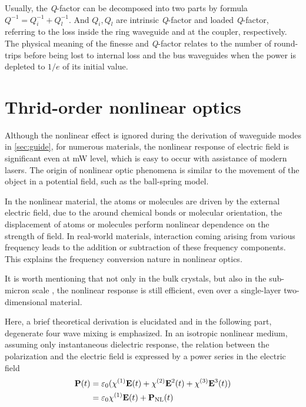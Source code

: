 Usually, the \textit{Q}-factor can be decomposed into two parts by formula $Q^{-1}=Q_{i}^{-1} + Q_{l}^{-1}$. And $Q_{i}, Q_{l}$ are intrinsic \textit{Q}-factor and loaded \textit{Q}-factor, referring to the loss inside the ring waveguide and at the coupler, respectively. The physical meaning of the finesse and \textit{Q}-factor relates to the number of round-trips before being lost to internal loss and the bus waveguides when the power is depleted to $1/e$ of its initial value.

\section{Thrid-order nonlinear optics}

Although the nonlinear effect is ignored during the derivation of waveguide modes in \autoref{sec:guide}, 
for numerous materials, the nonlinear response of electric field is significant even at mW level, which is easy to occur with assistance of modern lasers. The origin of nonlinear optic phenomena is similar to the movement of the object in a potential field, such as the ball-spring model. 

In the nonlinear material, the atoms or molecules are driven by the external electric field, due to the around chemical bonds or molecular orientation, the displacement of atoms or molecules perform nonlinear dependence on the strength of field. In real-world materials, interaction coming arising from various frequency leads to the addition or subtraction of these frequency components. This explains the frequency conversion nature in nonlinear optics.

It is worth mentioning that not only in the bulk crystals, but also in the sub-micron scale \cite{Leuthold2010}, the nonlinear response is still efficient, even over a single-layer two-dimensional material.

Here, a brief theoretical derivation is elucidated and in the following part, degenerate four wave mixing is emphasized. In an isotropic nonlinear medium, assuming only instantaneous dielectric response, the relation between the polarization and the electric field is expressed by a power series in the electric field
\begin{align}\label{eq:nlp}
    \vb{P}(t) & = \varepsilon_0 \large (\chi^{(1)}\vb{E}(t) + \chi^{(2)}\vb{E}^2(t) + \chi^{(3)}\vb{E}^3(t)) \\
			& = \varepsilon_0 \chi^{(1)}\vb{E}(t) + \vb{P}_\mathrm{NL}(t)
\end{align}

